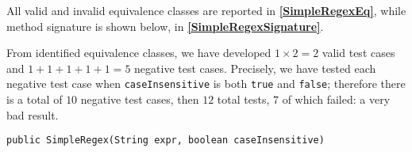 \documentclass[sigconf]{acmart}
\begin{document}
All valid and invalid equivalence classes are reported in \textbf{\cref{SimpleRegexEq}}, while method signature is shown below, in \textbf{\cref{SimpleRegexSignature}}.

From identified equivalence classes, we have developed $1 \times 2 = 2$ valid test cases and $1+1+1+1+1=5$ negative test cases. Precisely, we have tested each negative test case when \texttt{caseInsensitive} is both \texttt{true} and \texttt{false}; therefore there is a total of $10$ negative test cases, then $12$ total tests, $7$ of which failed: a very bad result.

\begin{lstlisting}[frame=lines,basicstyle=\ttfamily\tiny, caption={Signature of method \texttt{SimpleRegex}}, label={SimpleRegexSignature}]
public SimpleRegex(String expr, boolean caseInsensitive)
\end{lstlisting}
\end{document}
